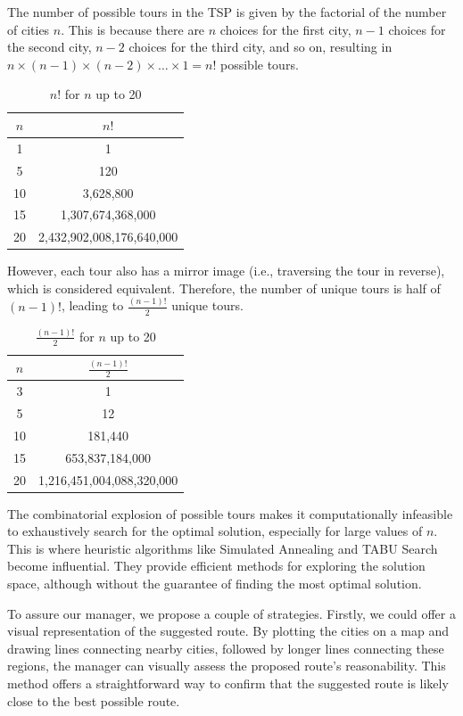 The number of possible tours in the TSP is given by the factorial of the number of cities \( n \). This is because there are \( n \) choices for the first city, \( n-1 \) choices for the second city, \( n-2 \) choices for the third city, and so on, resulting in \( n \times (n-1) \times (n-2) \times \ldots \times 1 = n! \) possible tours.
\begin{table}[H]
\centering
\begin{tabular}{cc} 
\toprule
\(n\) & \(n!\) \\ 
\midrule
1 & 1 \\ 
\hline
5 & 120 \\ 
\hline
10 & 3,628,800 \\ 
\hline
15 & 1,307,674,368,000 \\ 
\hline
20 & 2,432,902,008,176,640,000 \\ 
\hline
\end{tabular}
\caption{\(n!\) for \(n\) up to 20}
\end{table}
However, each tour also has a mirror image (i.e., traversing the tour in reverse), which is considered equivalent. Therefore, the number of unique tours is half of \( (n-1)! \), leading to \( \frac{(n-1)!}{2} \) unique tours. 
\begin{table}[H]
\centering
\begin{tabular}{cc} 
\toprule
\(n\) & \( \frac{(n-1)!}{2} \) \\ 
\midrule
3 & 1 \\ 
\hline
5 & 12 \\ 
\hline
10 & 181,440 \\ 
\hline
15 & 653,837,184,000 \\ 
\hline
20 & 1,216,451,004,088,320,000 \\ 
\hline
\end{tabular}
\caption{\( \frac{(n-1)!}{2} \) for \(n\) up to 20}
\end{table}
The combinatorial explosion of possible tours makes it computationally infeasible to exhaustively search for the optimal solution, especially for large values of \( n \). This is where heuristic algorithms like Simulated Annealing and TABU Search become influential. They provide efficient methods for exploring the solution space, although without the guarantee of finding the most optimal solution.

To assure our manager, we propose a couple of strategies. Firstly, we could offer a visual representation of the suggested route. By plotting the cities on a map and drawing lines connecting nearby cities, followed by longer lines connecting these regions, the manager can visually assess the proposed route's reasonability. This method offers a straightforward way to confirm that the suggested route is likely close to the best possible route.

